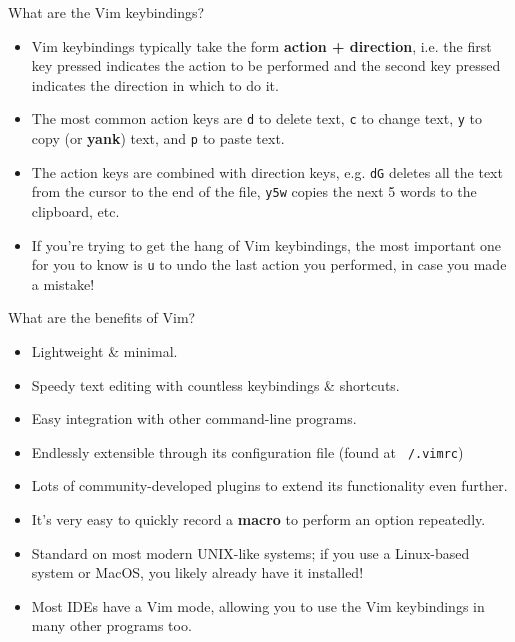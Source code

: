 \documentclass[]{beamer}
\begin{document}
\begin{frame}{What are the Vim keybindings?}
    \begin{itemize}
        \item   Vim keybindings typically take the form \textbf{action + direction}, i.e. the first key pressed
                indicates the action to be performed and the second key pressed indicates the direction in which to do
                it.
        \item   The most common action keys are \texttt{d} to delete text, \texttt{c} to change text, \texttt{y} to copy
                (or \textbf{yank}) text, and \texttt{p} to paste text.
        \item   The action keys are combined with direction keys, e.g. \texttt{dG} deletes all the text from the cursor
                to the end of the file, \texttt{y5w} copies the next 5 words to the clipboard, etc.
        \item   If you're trying to get the hang of Vim keybindings, the most important one for you to know is
                \texttt{u} to undo the last action you performed, in case you made a mistake!
    \end{itemize}
\end{frame}

\begin{frame}{What are the benefits of Vim?}
    \begin{itemize}
        \item   Lightweight \& minimal.
        \item   Speedy text editing with countless keybindings \& shortcuts.
        \item   Easy integration with other command-line programs.
        \item   Endlessly extensible through its configuration file (found at \texttt{~/.vimrc})
        \item   Lots of community-developed plugins to extend its functionality even further.
        \item   It's very easy to quickly record a \textbf{macro} to perform an option repeatedly.
        \item   Standard on most modern UNIX-like systems; if you use a Linux-based system or MacOS, you likely already
                have it installed!
        \item   Most IDEs have a Vim mode, allowing you to use the Vim keybindings in many other programs too.
    \end{itemize}
\end{frame}
\end{document}
